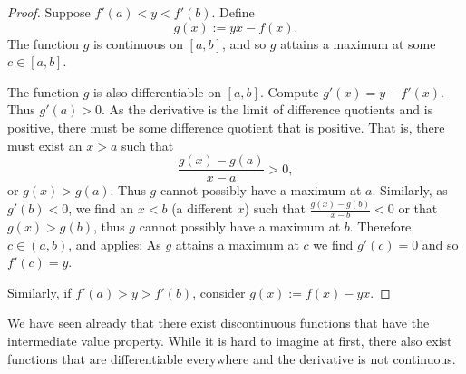 \begin{proof}
Suppose 
$f'(a) < y < f'(b)$.
Define
\begin{equation*}
g(x) := yx - f(x) .
\end{equation*}
The function $g$ is continuous on $[a,b]$, and so $g$ attains a maximum at some $c \in
[a,b]$.

The function $g$ is also differentiable on $[a,b]$.
Compute $g'(x) = y-f'(x)$.  Thus $g'(a) > 0$.  As the derivative is
the limit of difference quotients and is positive, there must be some
difference quotient that is positive.  That is, there must exist
an $x > a$ such that
\begin{equation*}
\frac{g(x)-g(a)}{x-a} > 0 ,
\end{equation*}
or $g(x) > g(a)$.  Thus $g$
cannot possibly have a maximum at $a$.  Similarly, as $g'(b) < 0$,
we find an $x < b$ (a different $x$) such that
$\frac{g(x)-g(b)}{x-b} < 0$ or that $g(x) > g(b)$, thus
$g$ cannot possibly have a maximum at $b$.
Therefore, $c \in (a,b)$,
and  applies: As $g$ attains a maximum
at $c$ we find $g'(c) = 0$
and so $f'(c) = y$.

Similarly, if $f'(a) > y > f'(b)$, consider $g(x) := f(x)- yx$.
\end{proof}

We have seen already that
there exist discontinuous functions that have the
intermediate value property.  While it is hard to imagine at first, there
also
exist functions that are differentiable everywhere and the derivative is not
continuous.

